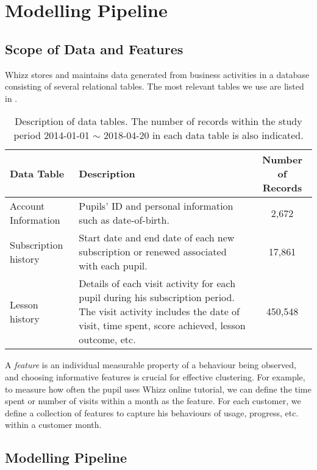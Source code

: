 \documentclass[english,a4,oneside,9pt]{extarticle}
\begin{document}
\section{Modelling Pipeline}

\subsection*{Scope of Data and Features}

Whizz stores and maintains data generated from business activities in a database consisting of several relational tables. The most relevant tables we use are listed in . %

\begin{table}[!h]
\centering
\footnotesize
\begin{tabular}{l|p{6cm}|c}
\hline
\textbf{Data Table} & \textbf{Description}  & \textbf{Number of Records} \\
\hline
Account Information &
Pupils' ID and personal information such as date-of-birth. & 2,672 \\
\hline
Subscription history &
Start date and end date of each new subscription or renewed associated with each pupil.  & 17,861 \\
\hline
Lesson history &
Details of each visit activity for each pupil during his subscription period. The visit activity includes the date of visit, time spent, score achieved, lesson outcome, etc. & 450,548 \\
\hline
\end{tabular}
\caption{Description of data tables. The number of records within the study period 2014-01-01 $\sim$ 2018-04-20 in each data table is also indicated.}
\label{tab:dataTable}
\end{table}

A \textit{feature} is an individual measurable property of a behaviour being observed, and choosing informative features is crucial for effective clustering. For example, to measure how often the pupil uses Whizz online tutorial, we can define the time spent or number of visits within a month as the feature. For each customer, we define a collection of features to capture his behaviours of usage, progress, etc. within a customer month.

\subsection*{Modelling Pipeline}
\end{document}
